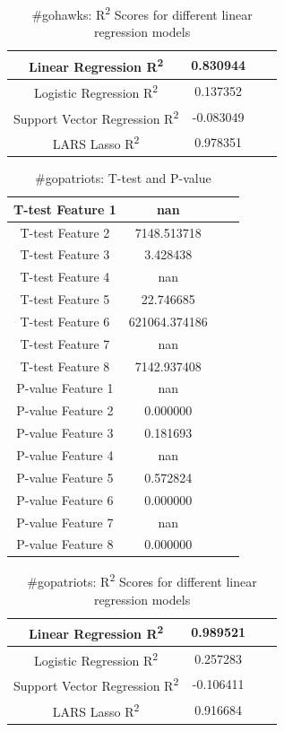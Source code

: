 \documentclass[12pt]{article}
\begin{document}
\begin{table}[H]
	\centering
	\begin{tabular}{| c | c | c | c |}
		\hline 
		Linear Regression R\textsuperscript2  & 0.830944 \\\hline
		Logistic Regression R\textsuperscript2  & 0.137352 \\\hline
		Support Vector Regression R\textsuperscript2  & -0.083049 \\\hline
		LARS Lasso R\textsuperscript2  & 0.978351 \\\hline
	\end{tabular} 
	\caption{\#gohawks: R\textsuperscript2 Scores for different linear regression models}
	\label{part1:tab1}
\end{table} 


\begin{table}[H]
	\centering
	\begin{tabular}{| c | c | c | c |}
		\hline 
		T-test Feature 1 & nan \\\hline
		T-test Feature 2 & 7148.513718 \\\hline
		T-test Feature 3 & 3.428438 \\\hline 
		T-test Feature 4 & nan \\\hline
		T-test Feature 5 & 22.746685 \\\hline
		T-test Feature 6 & 621064.374186 \\\hline
		T-test Feature 7 & nan \\\hline
		T-test Feature 8 & 7142.937408 \\\hline
		P-value Feature 1 & nan \\\hline
		P-value Feature 2 & 0.000000 \\\hline
		P-value Feature 3 & 0.181693 \\\hline
		P-value Feature 4 & nan \\\hline
		P-value Feature 5 & 0.572824 \\\hline
		P-value Feature 6 & 0.000000 \\\hline
		P-value Feature 7 & nan \\\hline
		P-value Feature 8 & 0.000000 \\\hline
	\end{tabular} 
	\caption{\#gopatriots: T-test and P-value}
	\label{part1:tab1}
\end{table} 


\begin{table}[H]
	\centering
	\begin{tabular}{| c | c | c | c |}
		\hline 
		Linear Regression R\textsuperscript2  & 0.989521 \\\hline
		Logistic Regression R\textsuperscript2  & 0.257283 \\\hline
		Support Vector Regression R\textsuperscript2  & -0.106411 \\\hline
		LARS Lasso R\textsuperscript2  & 0.916684 \\\hline
	\end{tabular} 
	\caption{\#gopatriots: R\textsuperscript2 Scores for different linear regression models}
	\label{part1:tab1}
\end{table} 
\end{document}
